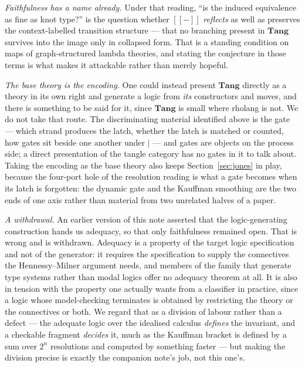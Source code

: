 \documentclass[11pt]{article}
\theoremstyle{definition}
\newcommand{\enc}[1]{[\![ #1 ]\!]}
\begin{document}
\emph{Faithfulness has a name already.} Under that reading, ``is the induced
equivalence as fine as knot type?'' is the question whether $\enc{-}$
\emph{reflects} as well as preserves the context-labelled transition structure ---
that no branching present in $\mathbf{Tang}$ survives into the image only in
collapsed form. That is a standing condition on maps of graph-structured lambda
theories, and stating the conjecture in those terms is what makes it attackable
rather than merely hopeful.

\emph{The base theory is the encoding.} One could instead present $\mathbf{Tang}$
directly as a theory in its own right and generate a logic from \emph{its}
constructors and moves, and there is something to be said for it, since
$\mathbf{Tang}$ is small where rholang is not. We do not take that route. The
discriminating material identified above is the gate --- which strand produces the
latch, whether the latch is matched or counted, how gates sit beside one another
under $\mid$ --- and gates are objects on the process side; a direct presentation
of the tangle category has no gates in it to talk about. Taking the encoding as
the base theory also keeps Section~\ref{sec:jones} in play, because the four-port
hole of the resolution reading is what a gate becomes when its latch is forgotten:
the dynamic gate and the Kauffman smoothing are the two ends of one axis rather
than material from two unrelated halves of a paper.

\emph{A withdrawal.} An earlier version of this note asserted that the
logic-generating construction hands us adequacy, so that only faithfulness
remained open. That is wrong and is withdrawn. Adequacy is a property of the
target logic specification and not of the generator: it requires the specification
to supply the connectives the Hennessy--Milner argument needs, and members of the
family that generate type systems rather than modal logics offer no adequacy
theorem at all. It is also in tension with the property one actually wants from a
classifier in practice, since a logic whose model-checking terminates is obtained
by restricting the theory or the connectives or both. We regard that as a division
of labour rather than a defect --- the adequate logic over the idealised calculus
\emph{defines} the invariant, and a checkable fragment \emph{decides} it, much as
the Kauffman bracket is defined by a sum over $2^n$ resolutions and computed by
something faster --- but making the division precise is exactly the companion
note's job, not this one's.
\end{document}

